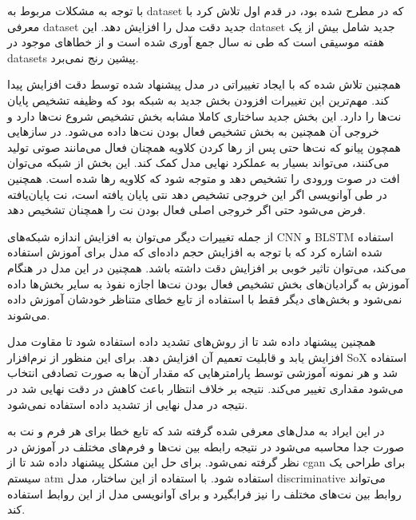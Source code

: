 با توجه به مشکلات مربوط به \gls{dataset} که در \cite{hawthorne2017onsets} مطرح
شده بود، \cite{hawthorne2018enabling} در قدم اول تلاش کرد با معرفی \gls{dataset}
جدید دقت مدل را افزایش دهد. این \gls{dataset} جدید شامل بیش از یک هفته موسیقی
است که طی نه سال جمع آوری شده است و از خطاهای موجود در \glspl{dataset} پیشین رنج
نمی‌برد.

همچنین تلاش شده که با ایجاد تغییراتی در مدل پیشنهاد شده توسط
\cite{hawthorne2017onsets} دقت افزایش پیدا کند. مهم‌ترین این تغییرات افزودن بخش
جدید به شبکه بود که وظیفه تشخیص پایان نت‌ها را دارد. این بخش جدید ساختاری کاملا
مشابه بخش تشخیص شروع نت‌ها دارد و خروجی آن همچنین به بخش تشخیص فعال بودن نت‌ها
داده می‌شود. در سازهایی همچون پیانو که نت‌ها حتی پس از رها کردن کلاویه همچنان
فعال می‌مانند صوتی تولید می‌کنند، می‌تواند بسیار به عملکرد نهایی مدل کمک کند.
این بخش از شبکه می‌توان افت در صوت ورودی را تشخیص دهد و متوجه شود که کلاویه رها
شده است. همچنین در طی آوانویسی اگر این خروجی تشخیص دهد نتی پایان یافته است، نت
پایان‌یافته فرض می‌شود حتی اگر خروجی اصلی فعال بودن نت را همچنان تشخیص دهد.

از جمله تغییرات دیگر می‌توان به افزایش اندازه شبکه‌های \gls{CNN} و \gls{BLSTM}
استفاده شده اشاره کرد که با توجه به افزایش حجم داده‌ای که مدل برای آموزش استفاده
می‌کند، می‌توان تاثیر خوبی بر افزایش دقت داشته باشد. همچنین در این مدل در هنگام
آموزش به گرادیان‌های بخش تشخیص فعال بودن نت‌ها اجازه نفوذ به سایر بخش‌ها داده
نمی‌شود و بخش‌های دیگر فقط با استفاده از تابع خطای متناظر خودشان آموزش داده
می‌شوند.

همچنین پیشنهاد داده شد تا از روش‌های تشدید داده استفاده شود تا مقاوت مدل افزایش
یابد و قابلیت تعمیم آن افزایش دهد. برای این منظور از نرم‌افزار SoX استفاده شد و
هر نمونه آموزشی توسط پارامترهایی که مقدار آن‌ها به صورت تصادفی انتخاب می‌شود
مقداری تغییر می‌کند. نتیجه بر خلاف انتظار باعث کاهش در دقت نهایی شد در نتیجه در
مدل نهایی از تشدید داده استفاده نمی‌شود.

در \cite{kim2019adversarial} این ایراد به مدل‌های معرفی شده گرفته شد که تابع خطا
برای هر فرم و نت به صورت جدا محاسبه می‌شود در نتیجه رابطه بین نت‌ها و فرم‌های
مختلف در آموزش در نظر گرفته نمی‌شود. برای حل این مشکل پیشنهاد داده شد تا از
\gls{cgan} برای طراحی یک سیستم \gls{atm} استفاده شود. با استفاده از این ساختار،
مدل \gls{discriminative} می‌تواند روابط بین نت‌های مختلف را نیز فرابگیرد و برای
آوانویسی مدل از این روابط استفاده کند.

